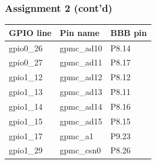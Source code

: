 \documentclass[aspectratio=169,usenames,dvipsnames]{beamer}
\newcounter{cont}
\begin{document}
\begin{frame}
  \frametitle{Assignment 2 (cont'd)}
      \begin{table}
        \begin{tabular}{| l | l | l |}
          \toprule
          GPIO line & Pin name & BBB pin      \\
          \midrule
          gpio0\_26 & gpmc\_ad10 & P8.14      \\
          gpio0\_27 & gpmc\_ad11 & P8.17      \\
          gpio1\_12 & gpmc\_ad12 & P8.12      \\
          gpio1\_13 & gpmc\_ad13 & P8.11      \\
          gpio1\_14 & gpmc\_ad14 & P8.16      \\
          gpio1\_15 & gpmc\_ad15 & P8.15      \\
          gpio1\_17 & gpmc\_a1   & P9.23      \\
          gpio1\_29 & gpmc\_csn0 & P8.26      \\
          \bottomrule
        \end{tabular}
      \end{table}
\end{frame}
\end{document}
